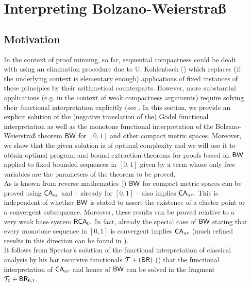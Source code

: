 \section{Interpreting Bolzano-Weierstra{\ss}} \label{s:bw}

\subsection*{Motivation}
In the context of proof minning, so far, 
sequential compactness could be dealt with using an elimination 
procedure due to U. Kohlenbach 
(\cite{Kohlenbach96,Kohlenbach_gp,Kohlenbach98,Kohlenbach00}) 
which replaces (if the underlying context is elementary enough) applications 
of fixed instances of these principles by their arithmetical counterparts. 
However, 
more substantial applications (e.g. in the context of 
weak compactness arguments) require solving their functional interpretation explicitly
(see \cite{KohlenbachMints,Kohlenbach(weakcompactness)}. 
In this section, we provide an explicit solution of the (negative translation of the) 
G\"odel functional 
interpretation as 
well as the monotone functional interpretation of the Bolzano-Weierstra\ss{} 
theorem $\textsf{\upshape BW}$ for $[0,1]$ and other compact metric spaces. Moreover, we show  
that the given solution is of optimal complexity and we will use it to 
obtain optimal program and bound extraction theorems for proofs based on 
$\textsf{\upshape BW}$ applied to 
fixed bounded sequences in $[0,1]$ 
given by a term whose only free variables are the parameters 
of the theorem to be proved. 
\\[1mm]   
As is known from reverse mathematics (\cite{Simpson99}) $\textsf{\upshape BW}$ for 
compact metric spaces can be 
proved using $\textsf{\upshape CA}_{ar}$ and -- already for $[0,1]$ -- 
also implies $\textsf{\upshape CA}_{ar}$. This is independent of whether 
$\textsf{\upshape BW}$ is stated to assert the existence of a cluster point or a convergent 
subsequence. Moreover, these results can be proved
 relative to a very weak base system $\textsf{\upshape RCA}_0.$ In fact, already 
the special case of $\textsf{\upshape BW}$ stating that every monotone sequence in $[0,1]$ is 
convergent implies $\textsf{\upshape CA}_{ar}$ (much refined results in this direction can be 
found in \cite{Kohlenbach00}). 
\\[1mm] It follows from Spector's solution of the functional 
interpretation of classical analysis by his bar recursive functionals 
$\mathcal{T}+(\textsf{\upshape BR})$ 
(\cite{Spector62})  that the functional interpretation 
of $\textsf{\upshape CA}_{ar}$ and hence of $\textsf{\upshape BW}$ can be solved in the fragment $\mathcal{T}_0+\textsf{\upshape BR}_{0,1}$, 
